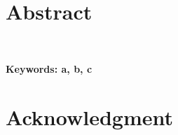 \date{}

\section*{Abstract}
\lipsum[1-2]\\  %


\vspace{0.5cm}

\noindent
\textbf{Keywords:
a, b, c
}

\vspace{1.0cm}

\section*{Acknowledgment}
\lipsum[3-3]\\


\newpage
\renewcommand*\contentsname{Table of Contents}
\tableofcontents

\newpage
